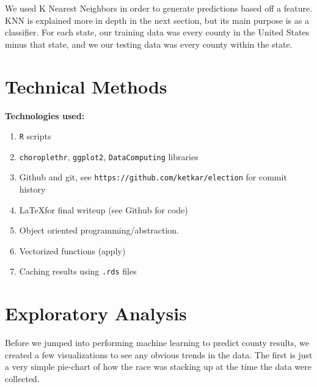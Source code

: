 \documentclass[11pt]{article}
\begin{document}
We used K Nearest Neighbors in order to generate predictions based off a feature. KNN is explained more in depth in the next section, but its main purpose is as a classifier. For each state, our training data was every county in the United States minus that state, and we our testing data was every county within the state.

\section{Technical Methods}
\textbf{Technologies used: } 
\begin{enumerate}
\item \texttt{R} scripts
\item \texttt{choroplethr}, \texttt{ggplot2}, \texttt{DataComputing} libraries
\item Github and git, see \texttt{https://github.com/ketkar/election} for commit history
\item \LaTeX for final writeup (see Github for code) 
\item Object oriented programming/abstraction. 
\item Vectorized functions (apply)
\item Caching results using \texttt{.rds} files
\end{enumerate}

\newpage

\section{Exploratory Analysis}
Before we jumped into performing machine learning to predict county results, we created a few visualizations to see any obvious trends in the data. The first is just a very simple pie-chart of how the race was stacking up at the time the data were collected. \\
\end{document}
